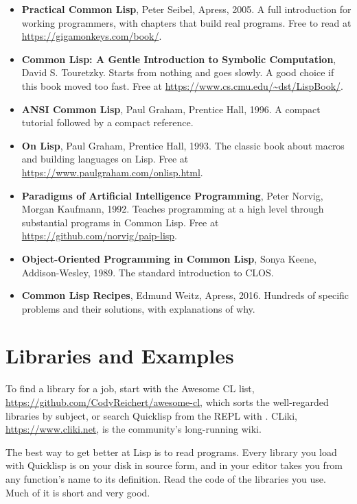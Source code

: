 \begin{itemize}
\item \textbf{Practical Common Lisp}, Peter Seibel, Apress, 2005. A
full introduction for working programmers, with chapters that build
real programs. Free to read at \url{https://gigamonkeys.com/book/}.

\item \textbf{Common Lisp: A Gentle Introduction to Symbolic
Computation}, David S. Touretzky. Starts from nothing and goes
slowly. A good choice if this book moved too fast. Free at
\url{https://www.cs.cmu.edu/~dst/LispBook/}.

\item \textbf{ANSI Common Lisp}, Paul Graham, Prentice Hall, 1996. A
compact tutorial followed by a compact reference.

\item \textbf{On Lisp}, Paul Graham, Prentice Hall, 1993. The classic
book about macros and building languages on Lisp. Free at
\url{https://www.paulgraham.com/onlisp.html}.

\item \textbf{Paradigms of Artificial Intelligence Programming},
Peter Norvig, Morgan Kaufmann, 1992. Teaches programming at a high
level through substantial programs in Common Lisp. Free at
\url{https://github.com/norvig/paip-lisp}.

\item \textbf{Object-Oriented Programming in Common Lisp}, Sonya
Keene, Addison-Wesley, 1989. The standard introduction to CLOS.

\item \textbf{Common Lisp Recipes}, Edmund Weitz, Apress, 2016.
Hundreds of specific problems and their solutions, with explanations
of why.
\end{itemize}

\section{Libraries and Examples}

To find a library for a job, start with the Awesome CL list,
\url{https://github.com/CodyReichert/awesome-cl}, which sorts the
well-regarded libraries by subject, or search Quicklisp from the REPL
with . CLiki, \url{https://www.cliki.net}, is
the community's long-running wiki.

The best way to get better at Lisp is to read programs. Every library
you load with Quicklisp is on your disk in source form, and
 in your editor takes you from any function's name to its
definition. Read the code of the libraries you use. Much of it is
short and very good.

